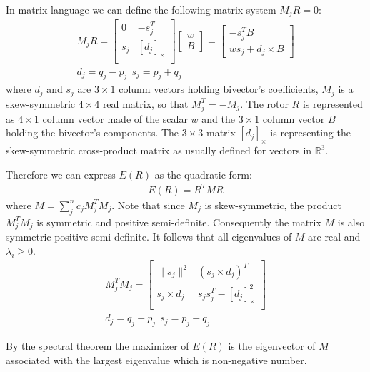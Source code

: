 \documentclass{birkjour}
\numberwithin{equation}{section}
\begin{document}
In matrix language we can define the following matrix system $M_j R = 0$:
\begin{eqnarray}
	M_j R =
	\left[\begin{array}{cc}
		0      &       -s_j^T \\
		s_j    &   \left[ d_j \right]_\times \\
	\end{array}\right]
	\left[\begin{array}{c} 
		w \\
		B
	\end{array}\right] = 
	\left[\begin{array}{c}
		-s_j^T B \\
		w s_j + d_j \times B 
	\end{array}\right]\\
	d_j = q_j - p_j \ \ s_j = p_j + q_j  \nonumber
\end{eqnarray}
where $d_j$ and $s_j$ are $3 \times 1$ column vectors holding bivector's coefficients, $M_j$ is a skew-symmetric $4\times 4$ real matrix, so that $M_j^T = -M_j$. The rotor $R$ is represented as $4 \times 1$ column vector made of the scalar $w$ and the $3 \times 1$ column vector $B$ holding the bivector's components. The $3\times 3$ matrix $\left[ d_j \right]_\times$ is representing the skew-symmetric cross-product matrix as usually defined for vectors in $\mathbb R^3$.

Therefore we can express $E(R)$ as the quadratic form:
\begin{eqnarray}
E(R) = R^T M R \nonumber
\end{eqnarray}
where $M = \sum_j^n { c_j M_j^T M_j}$. Note that since $M_j$ is skew-symmetric, the product $M_j^T M_j$ is symmetric and positive semi-definite.
Consequently the matrix $M$ is also symmetric positive semi-definite. It follows that all eigenvalues of $M$ are real and $\lambda_i \geq 0$.
\begin{eqnarray}
	M_j^T M_j = 
	\left[\begin{array}{cc}
		\| s_j \|^2       &         (s_j \times d_j)^T \\
		s_j \times d_j  &    s_j s_j^T - \left[ d_j \right]^2_\times \\
	\end{array}\right]\\
	d_j = q_j - p_j \ \ s_j = p_j + q_j  \nonumber
\end{eqnarray}

By the spectral theorem the maximizer of $E(R)$ is the eigenvector of $M$ associated with the largest eigenvalue which is non-negative number.
\end{document}
